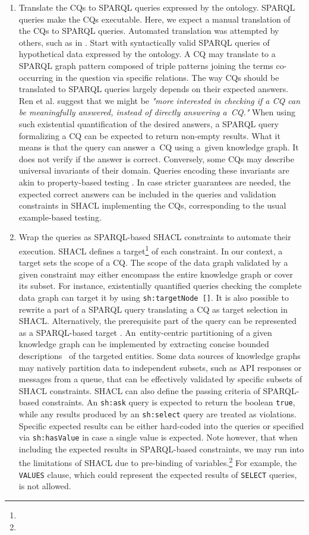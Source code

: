 \documentclass[
]{ceurart}
\begin{document}
\begin{enumerate}
    \item Translate the CQs to SPARQL queries expressed by the ontology. SPARQL queries make the CQs executable. Here, we expect a manual translation of the CQs to SPARQL queries. Automated translation was attempted by others, such as in \cite{EspinozaArias2022}. Start with syntactically valid SPARQL queries of hypothetical data expressed by the ontology. A CQ may translate to a SPARQL graph pattern composed of triple patterns joining the terms co-occurring in the question via specific relations. The way CQs should be translated to SPARQL queries largely depends on their expected answers. Ren et al. \cite{Ren2014} suggest that we might be \textit{"more interested in checking if a CQ can be meaningfully answered, instead of directly answering a~CQ."} When using such existential quantification of the desired answers, a SPARQL query formalizing a CQ can be expected to return non-empty results. What it means is that the query can answer a~CQ using a~given knowledge graph. It does not verify if the answer is correct. Conversely, some CQs may describe universal invariants of their domain. Queries encoding these invariants are akin to property-based testing \cite{Fink1997}. In case stricter guarantees are needed, the expected correct answers can be included in the queries and validation constraints in SHACL implementing the CQs, corresponding to the usual example-based testing.
    \item Wrap the queries as SPARQL-based SHACL constraints to automate their execution. SHACL defines a target\footnote{\urlshacltargets} of each constraint. In our context, a target sets the scope of a CQ. The scope of the data graph validated by a given constraint may either encompass the entire knowledge graph or cover its subset. For instance, existentially quantified queries checking the complete data graph can target it by using \texttt{sh:targetNode []}. It is also possible to rewrite a part of a SPARQL query translating a CQ as target selection in SHACL. Alternatively, the prerequisite part of the query can be represented as a SPARQL-based target \cite{SHACLAF2017}. An~entity-centric partitioning of a given knowledge graph can be implemented by extracting concise bounded descriptions~\cite{Stickler2005} of the targeted entities. Some data sources of knowledge graphs may natively partition data to independent subsets, such as API responses or messages from a queue, that can be effectively validated by specific subsets of SHACL constraints. SHACL can also define the passing criteria of SPARQL-based constraints. An \texttt{sh:ask} query is expected to return the boolean \texttt{true}, while any results produced by an \texttt{sh:select} query are treated as violations. Specific expected results can be either hard-coded into the queries or specified via \texttt{sh:hasValue} in case a single value is expected. Note however, that when including the expected results in SPARQL-based constraints, we may run into the limitations of SHACL due to pre-binding of variables.\footnote{\urlshaclprebinding} For example, the \texttt{VALUES} clause, which could represent the expected results of \texttt{SELECT} queries, is not allowed.

\end{enumerate}
\end{document}
